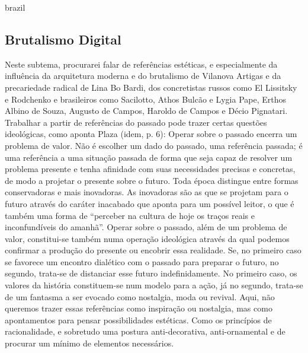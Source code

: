 \begin{otherlanguage*}{brazil}
\subsection{Brutalismo Digital}
Neste subtema, procurarei falar de referências estéticas, e especialmente da influência da arquitetura moderna e do brutalismo de Vilanova Artigas e da precariedade radical de Lina Bo Bardi, dos concretistas russos como El Lissitsky e Rodchenko e brasileiros como Sacilotto, Athos Bulcão e Lygia Pape, Erthos Albino de Souza, Augusto de Campos, Haroldo de Campos e Décio Pignatari. Trabalhar a partir de  referências do passado pode trazer certas questões ideológicas, como aponta Plaza (idem, p. 6):
Operar sobre o passado encerra um problema de valor. Não é escolher um dado do passado, uma referência passada; é uma referência a uma situação passada de forma que seja capaz de resolver um problema presente e tenha afinidade com suas necessidades precisas e concretas, de modo a projetar o presente sobre o futuro. Toda época distingue entre formas conservadoras e mais inovadoras. As inovadoras são as que se projetam para o futuro através do caráter inacabado que aponta para um possível leitor, o que é também uma forma de ``perceber na cultura de hoje os traços reais e inconfundíveis do amanhã''. Operar sobre o passado, além de um problema de valor, constitui-se também numa operação ideológica através da qual podemos confirmar a produção do presente ou encobrir essa realidade. Se, no primeiro caso se favorece um encontro dialético com o passado para preparar o futuro, no segundo, trata-se de distanciar esse futuro indefinidamente. No primeiro caso, os valores da história constituem-se num modelo para a ação, já no segundo, trata-se de um fantasma a ser evocado como nostalgia, moda ou revival.
Aqui, não queremos trazer essas referências como inspiração ou nostalgia, mas como apontamentos para pensar possibilidades estéticas. Como os princípios de racionalidade,  e sobretudo uma postura anti-decorativa, anti-ornamental e de procurar um mínimo de elementos necessários. 


\end{otherlanguage*}
